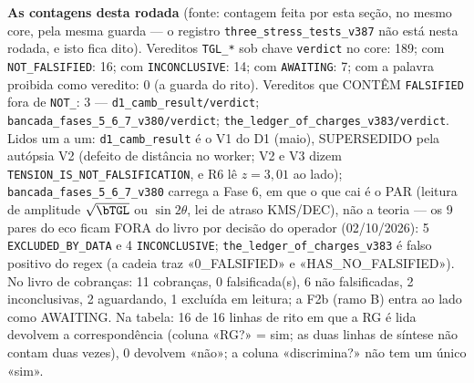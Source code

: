 \textbf{As contagens desta rodada} (fonte: contagem feita por esta seção, no mesmo core, pela mesma guarda --- o registro \texttt{three\_stress\_tests\_v387} não está nesta rodada, e isto fica dito). Vereditos \texttt{TGL\_*} sob chave \texttt{verdict} no core: 189; com \texttt{NOT\_FALSIFIED}: 16; com \texttt{INCONCLUSIVE}: 14; com \texttt{AWAITING}: 7; com a palavra proibida como veredito: 0 (a guarda do rito). Vereditos que CONTÊM \texttt{FALSIFIED} fora de \texttt{NOT\_}: 3 --- \texttt{d1\_camb\_result/verdict}; \texttt{bancada\_fases\_5\_6\_7\_v380/verdict}; \texttt{the\_ledger\_of\_charges\_v383/verdict}. Lidos um a um: \texttt{d1\_camb\_result} é o V1 do D1 (maio), SUPERSEDIDO pela autópsia V2 (defeito de distância no worker; V2 e V3 dizem \texttt{TENSION\_IS\_NOT\_FALSIFICATION}, e R6 lê $z=3{,}01$ ao lado); \texttt{bancada\_fases\_5\_6\_7\_v380} carrega a Fase 6, em que o que cai é o PAR (leitura de amplitude $\sqrt{\bTGL}$ ou $\sin2\theta$, lei de atraso KMS/DEC), não a teoria --- os 9 pares do eco ficam FORA do livro por decisão do operador (02/10/2026): 5 \texttt{EXCLUDED\_BY\_DATA} e 4 \texttt{INCONCLUSIVE}; \texttt{the\_ledger\_of\_charges\_v383} é falso positivo do regex (a cadeia traz «0\_FALSIFIED» e «HAS\_NO\_FALSIFIED»). No livro de cobranças: 11 cobranças, 0 falsificada(s), 6 não falsificadas, 2 inconclusivas, 2 aguardando, 1 excluída em leitura; a F2b (ramo B) entra ao lado como AWAITING. Na tabela: 16 de 16 linhas de rito em que a RG é lida devolvem a correspondência (coluna «RG?» = sim; as duas linhas de síntese não contam duas vezes), 0 devolvem «não»; a coluna «discrimina?» não tem um único «sim».

